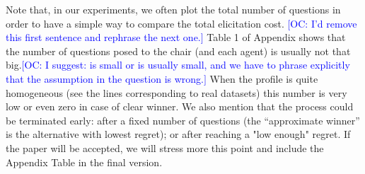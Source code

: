 \documentclass{article}
\newcommand{\commentOC}[1]{\textcolor{blue}{\small$\big[$OC: #1$\big]$}}
\begin{document}
Note that, in our experiments, we often plot the total number of questions in order to have a simple way to compare the total elicitation cost. 
\commentOC{I’d remove this first sentence and rephrase the next one.}
Table 1 of Appendix shows that the number of questions posed to the chair (and each agent) is usually not that big.\commentOC{I suggest: is small or is usually small, and we have to phrase explicitly that the assumption in the question is wrong.}
When the profile is quite homogeneous (see the lines corresponding to real datasets) this number is very low or even zero in case of clear winner. We also mention that the process could be terminated early: after a fixed number of questions (the “approximate winner” is the alternative with lowest regret); or after reaching a "low enough" regret.
If the paper will be accepted, we will stress more this point and include the Appendix Table in the final version.
\end{document}
